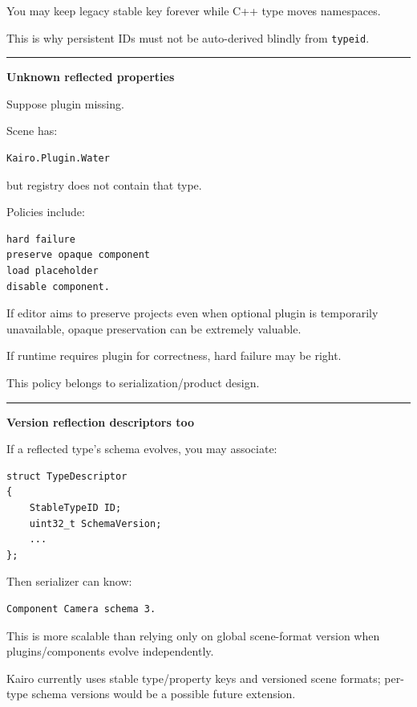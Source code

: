 You may keep legacy stable key forever while C++ type moves namespaces.

This is why persistent IDs must not be auto-derived blindly from \texttt{typeid}.

\begin{center}\rule{0.5\linewidth}{0.5pt}\end{center}

\textbf{Unknown reflected properties}

Suppose plugin missing.

Scene has:

\begin{verbatim}
Kairo.Plugin.Water
\end{verbatim}

but registry does not contain that type.

Policies include:

\begin{verbatim}
hard failure
preserve opaque component
load placeholder
disable component.
\end{verbatim}

If editor aims to preserve projects even when optional plugin is temporarily unavailable, opaque preservation can be extremely valuable.

If runtime requires plugin for correctness, hard failure may be right.

This policy belongs to serialization/product design.

\begin{center}\rule{0.5\linewidth}{0.5pt}\end{center}

\textbf{Version reflection descriptors too}

If a reflected type's schema evolves, you may associate:

\begin{verbatim}
struct TypeDescriptor
{
    StableTypeID ID;
    uint32_t SchemaVersion;
    ...
};
\end{verbatim}

Then serializer can know:

\begin{verbatim}
Component Camera schema 3.
\end{verbatim}

This is more scalable than relying only on global scene-format version when plugins/components evolve independently.

Kairo currently uses stable type/property keys and versioned scene formats; per-type schema versions would be a possible future extension.

